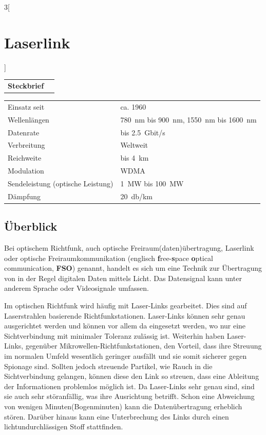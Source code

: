 \begin{multicols}{3}[\section{Laserlink}]


\newrefsegment

\begin{tabular}{p{}p{2.7 cm}}
\textbf{Steckbrief}& \\
\end{tabular}
\begin{tabular}{p{}p{2.7 cm}}
      Einsatz seit & ca. 1960\\
      Wellenlängen & \SI{780}{\nano\metre} bis \SI{900}{\nano\metre}, \SI{1550}{\nano\metre} bis \SI{1600}{\nano\metre}\\
      Datenrate & bis \SI{2,5}{Gbit/s}\\
      Verbreitung & Weltweit\\
      Reichweite & bis \SI{4}{\kilo\metre}\\
      Modulation & WDMA\\
      Sendeleistung (optische Leistung) & \SI{1}{\mega\watt} bis \SI{100}{\mega\watt}\\
      Dämpfung & \SI{20}{\decibel/\kilo\metre}\\
\end{tabular}
\par

\subsection*{Überblick}
Bei optischem Richtfunk, auch optische Freiraum(daten)übertragung, Laserlink oder optische Freiraumkommunikation (englisch \textbf{f}ree-\textbf{s}pace \textbf{o}ptical communication, \textbf{FSO}) genannt, handelt es sich um eine Technik zur Übertragung von in der Regel digitalen Daten mittels Licht. Das Datensignal kann unter anderem Sprache oder Videosignale umfassen.

Im optischen Richtfunk wird häufig mit Laser-Links gearbeitet. Dies sind auf Laserstrahlen basierende Richtfunkstationen. Laser-Links können sehr genau ausgerichtet werden und können vor allem da eingesetzt werden, wo nur eine Sichtverbindung mit minimaler Toleranz zulässig ist. Weiterhin haben Laser-Links, gegenüber Mikrowellen-Richtfunkstationen, den Vorteil, dass ihre Streuung im normalen Umfeld wesentlich geringer ausfällt und sie somit sicherer gegen Spionage sind. Sollten jedoch streuende Partikel, wie Rauch in die Sichtverbindung gelangen, können diese den Link so streuen, dass eine Ableitung der Informationen problemlos möglich ist. Da Laser-Links sehr genau sind, sind sie auch sehr störanfällig, was ihre Ausrichtung betrifft. Schon eine Abweichung von wenigen Minuten(Bogenminuten) kann die Datenübertragung erheblich stören. Darüber hinaus kann eine Unterbrechung des Links durch einen lichtundurchlässigen Stoff stattfinden. ~\cite{Laserlink.1}


\end{multicols}
